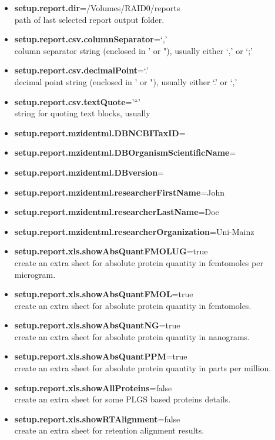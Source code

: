 \documentclass[]{article}
\providecommand{\tightlist}{%
  \setlength{\itemsep}{0pt}\setlength{\parskip}{0pt}}
\begin{document}
\begin{itemize}
\tightlist
\item
  \textbf{setup.report.dir}=/Volumes/RAID0/reports\\
  path of last selected report output folder.
\item
  \textbf{setup.report.csv.columnSeparator}=`,'\\
  column separator string (enclosed in ' or "), usually either `,' or
  `;'
\item
  \textbf{setup.report.csv.decimalPoint}=`.'\\
  decimal point string (enclosed in ' or "), usually either `.' or `,'
\item
  \textbf{setup.report.csv.textQuote}='``'\\
  string for quoting text blocks, usually
\item
  \textbf{setup.report.mzidentml.DBNCBITaxID}=
\item
  \textbf{setup.report.mzidentml.DBOrganismScientificName}=
\item
  \textbf{setup.report.mzidentml.DBversion}=
\item
  \textbf{setup.report.mzidentml.researcherFirstName}=John
\item
  \textbf{setup.report.mzidentml.researcherLastName}=Doe
\item
  \textbf{setup.report.mzidentml.researcherOrganization}=Uni-Mainz
\item
  \textbf{setup.report.xls.showAbsQuantFMOLUG}=true\\
  create an extra sheet for absolute protein quantity in femtomoles per
  microgram.
\item
  \textbf{setup.report.xls.showAbsQuantFMOL}=true\\
  create an extra sheet for absolute protein quantity in femtomoles.
\item
  \textbf{setup.report.xls.showAbsQuantNG}=true\\
  create an extra sheet for absolute protein quantity in nanograms.
\item
  \textbf{setup.report.xls.showAbsQuantPPM}=true\\
  create an extra sheet for absolute protein quantity in parts per
  million.
\item
  \textbf{setup.report.xls.showAllProteins}=false\\
  create an extra sheet for some PLGS based proteins details.
\item
  \textbf{setup.report.xls.showRTAlignment}=false\\
  create an extra sheet for retention alignment results.
\end{itemize}
\end{document}
